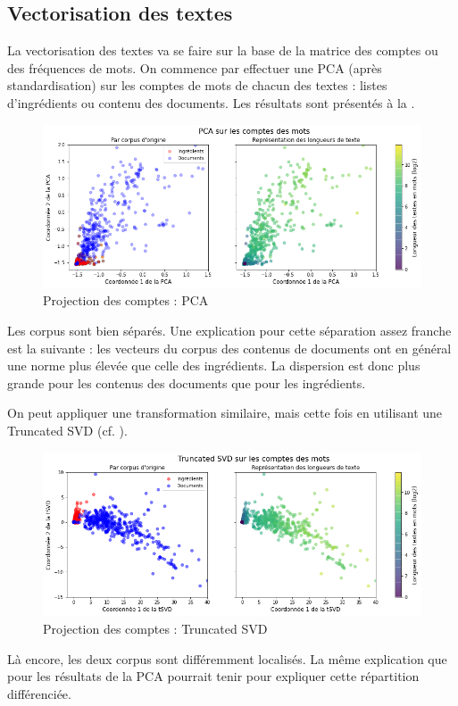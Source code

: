             \subsection{Vectorisation des textes}

            La vectorisation des textes va se faire sur la base de la matrice des comptes ou des fréquences de mots.
            On commence par effectuer une PCA (après standardisation) sur les comptes de mots de chacun des textes : listes d'ingrédients ou contenu des documents.
            Les résultats sont présentés à la .            
            \begin{figure}[htbp]
                \begin{center}
                \includegraphics[width=0.9\linewidth]{img/PCA_counts.png}
                \end{center}
                \caption{Projection des comptes : PCA}
                \label{fig:PCA_counts}
            \end{figure}
            Les corpus sont bien séparés. 
            Une explication pour cette séparation assez franche est la suivante : les vecteurs du corpus des contenus de documents ont en général une norme plus élevée que celle des ingrédients.
            La dispersion est donc plus grande pour les contenus des documents que pour les ingrédients.            

            On peut appliquer une transformation similaire, mais cette fois en utilisant une Truncated SVD (cf. ).
            \begin{figure}[htbp]
                \begin{center}
                \includegraphics[width=0.9\linewidth]{img/tSVD_counts.png}
                \end{center}
                \caption{Projection des comptes : Truncated SVD}
                \label{fig:tSVD_counts}
            \end{figure}
            Là encore, les deux corpus sont différemment localisés.
            La même explication que pour les résultats de la PCA pourrait tenir pour expliquer cette répartition différenciée.

